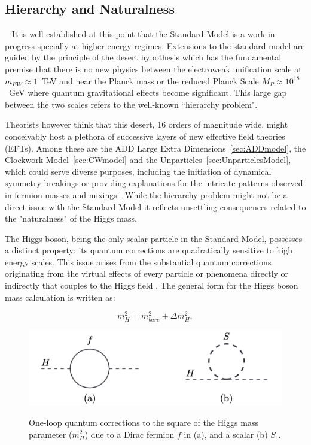 \subsection{Hierarchy and Naturalness}~\label{sec:HierarchyandNaturalness}
It is well-established at this point that the Standard Model is a work-in-progress specially at higher energy regimes. Extensions to the standard model are guided by the principle of the desert hypothesis which has the fundamental premise that there is no new physics between the electroweak unification scale at $m_{EW}\approx1$~TeV and near the Planck mass or the reduced Planck Scale $M_P\approx 10^{18}$~GeV where quantum gravitational effects become significant. This large gap between the two scales refers to the well-known ``hierarchy problem". 

Theorists however think that this desert, 16 orders of magnitude wide, might conceivably host a plethora of successive layers of new effective field theories (EFTs). Among these are the ADD Large Extra Dimensions~\ref{sec:ADDmodel}, the Clockwork Model~\ref{sec:CWmodel} and the Unparticles~\ref{sec:UnparticlesModel}, which could serve diverse purposes, including the initiation of dynamical symmetry breakings or providing explanations for the intricate patterns observed in fermion masses and mixings \cite{Arkani-Hamed:1998jmv}. While the hierarchy problem might not be a direct issue with the Standard Model it reflects unsettling consequences related to the "naturalness" of the Higgs mass. 

The Higgs boson, being the only scalar particle in the Standard Model, possesses a distinct property: its quantum corrections are quadratically sensitive to high energy scales. This issue arises from the substantial quantum corrections originating from the virtual effects of every particle or phenomena directly or indirectly that couples to the Higgs field \cite{Martin:1997ns}. The general form for the Higgs boson mass calculation is written as:

\begin{equation}
    \label{eq:HiggsMass}
    m^2_H = m^2_{bare} + \Delta m^2_{H}, 
\end{equation}

\begin{figure}[!htbp]
	\centering  
    \caption{One-loop quantum corrections to the square of the Higgs mass parameter ($m^2_{H}$) due to a Dirac fermion $f$ in (a), and a scalar (b) $S$ \cite{Martin:1997ns}. }
    \includegraphics[scale=1.0]{fig/LoopCorrHiggs.png}
	  \label{fig:HiggsQuantumCorr}
\end{figure}

